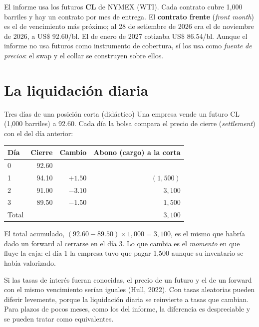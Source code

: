 \begin{informe}
El informe usa los futuros \textbf{CL} de NYMEX (WTI). Cada contrato cubre 1,000 barriles y hay un contrato por mes de entrega. El \textbf{contrato frente} (\emph{front month}) es el de vencimiento más próximo; al 28 de setiembre de 2026 era el de noviembre de 2026, a US\$ 92.60/bl. El de enero de 2027 cotizaba US\$ 86.54/bl. Aunque el informe no usa futuros como instrumento de cobertura, sí los usa como \emph{fuente de precios}: el swap y el collar se construyen sobre ellos.
\end{informe}

\section{La liquidación diaria}

\begin{ejemplo}{Tres días de una posición corta (didáctico)}
Una empresa vende un futuro CL (1,000 barriles) a 92.60. Cada día la bolsa compara el precio de cierre (\emph{settlement}) con el del día anterior:

\begin{center}\small
\begin{tabular}{@{}lrrr@{}}
\toprule
Día & Cierre & Cambio & Abono (cargo) a la corta\\
\midrule
0 & 92.60 & & \\
1 & 94.10 & $+1.50$ & $(1{,}500)$\\
2 & 91.00 & $-3.10$ & $3{,}100$\\
3 & 89.50 & $-1.50$ & $1{,}500$\\
\midrule
Total & & & $3{,}100$\\
\bottomrule
\end{tabular}
\end{center}

El total acumulado, $(92.60-89.50)\times1{,}000=3{,}100$, es el mismo que habría dado un forward al cerrarse en el día 3. Lo que cambia es el \emph{momento} en que fluye la caja: el día 1 la empresa tuvo que pagar 1,500 aunque su inventario se había valorizado.
\end{ejemplo}

\begin{adicional}
Si las tasas de interés fueran conocidas, el precio de un futuro y el de un forward con el mismo vencimiento serían iguales (Hull, 2022). Con tasas aleatorias pueden diferir levemente, porque la liquidación diaria se reinvierte a tasas que cambian. Para plazos de pocos meses, como los del informe, la diferencia es despreciable y se pueden tratar como equivalentes.
\end{adicional}

